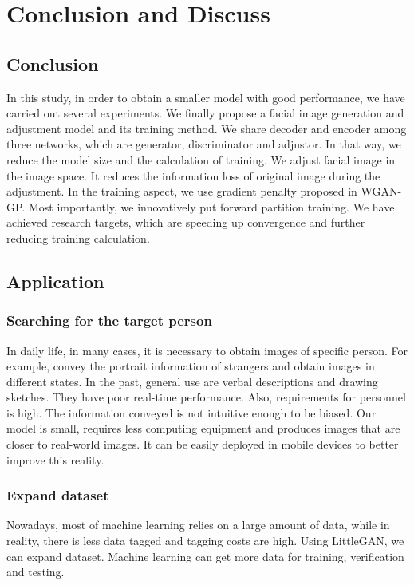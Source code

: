 \section{Conclusion and Discuss}
\subsection{Conclusion}
In this study, in order to obtain a smaller model with good performance, we have carried out several experiments.
We finally propose a facial image generation and adjustment model and its training method.
We share decoder and encoder among three networks, which are generator, discriminator and adjustor.
In that way, we reduce the model size and the calculation of training.
We adjust facial image in the image space. It reduces the information loss of original image during the adjustment.
In the training aspect, we use gradient penalty proposed in WGAN-GP.
Most importantly, we innovatively put forward partition training.
We have achieved research targets, which are speeding up convergence and further reducing training calculation.

\subsection{Application}
\subsubsection*{Searching for the target person}
In daily life, in many cases, it is necessary to obtain images of specific person.
For example, convey the portrait information of strangers and
    obtain images in different states.
In the past, general use are verbal descriptions and drawing sketches. They have poor real-time performance.
    Also, requirements for personnel is high. The information conveyed is not intuitive enough to be biased.
Our model is small, requires less computing equipment and produces images that are closer to real-world images.
It can be easily deployed in mobile devices to better improve this reality.

\subsubsection*{Expand dataset}
Nowadays, most of machine learning relies on a large amount of data,
    while in reality, there is less data tagged and tagging costs are high.
Using LittleGAN, we can expand dataset. Machine learning can get more data for training,
    verification and testing.


